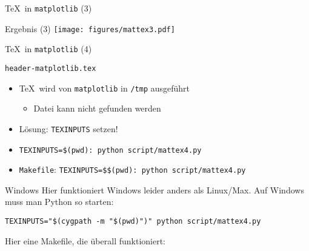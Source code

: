 \begin{frame}[fragile]{\TeX\ in \texttt{matplotlib} (3)}
\end{frame}

\AddToShipoutPictureFG*{\ShowFramePicture}
\begin{frame}{Ergebnis (3)}
  \centering
  \texttt{[image: figures/mattex3.pdf]}
\end{frame}

\begin{frame}[fragile]{\TeX\ in \texttt{matplotlib} (4)}
\end{frame}

\begin{frame}[fragile]{\texttt{header-matplotlib.tex}}
  

  \vspace*{-0.5em}
  \begin{itemize}
    \item \TeX\ wird von \texttt{matplotlib} in \texttt{/tmp} ausgeführt
      \begin{itemize}
        \item Datei kann nicht gefunden werden
      \end{itemize}
    \item Lösung: \texttt{TEXINPUTS} setzen!
    \item \texttt{TEXINPUTS=\$(pwd): python script/mattex4.py}
    \item \texttt{Makefile}: \texttt{TEXINPUTS=\$\$(pwd): python script/mattex4.py}
  \end{itemize}
  \vspace*{-1em}
\end{frame}

\begin{frame}[fragile]{Windows}
  Hier funktioniert Windows leider anders als Linux/Max.
  Auf Windows muss man Python so starten:

  \texttt{TEXINPUTS="\$(cygpath -m "\$(pwd)")" python script/mattex4.py}

  Hier eine Makefile, die überall funktioniert:

\end{frame}

